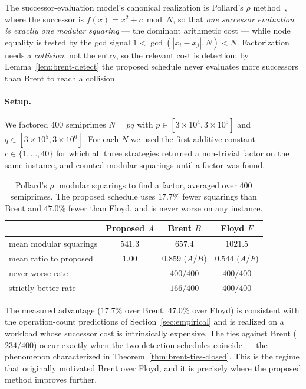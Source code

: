 \documentclass[11pt]{article}
\begin{document}
The successor-evaluation model's canonical realization is Pollard's $\rho$
method~\cite{pollard1975}, where the successor is $f(x)=x^2+c \bmod N$, so that
\emph{one successor evaluation is exactly one modular squaring} --- the dominant
arithmetic cost --- while node equality is tested by the gcd signal
$1<\gcd(|x_i-x_j|,N)<N$. Factorization needs a \emph{collision}, not the entry,
so the relevant cost is detection: by Lemma~\ref{lem:brent-detect} the proposed
schedule never evaluates more successors than Brent to reach a collision.

\paragraph{Setup.}
We factored $400$ semiprimes $N=pq$ with $p\in[3\times10^4,3\times10^5]$ and
$q\in[3\times10^5,3\times10^6]$. For each $N$ we used the first additive constant
$c\in\{1,\dots,40\}$ for which all three strategies returned a non-trivial factor
on the same instance, and counted modular squarings until a factor was found.

\begin{table}[H]\centering
\caption{Pollard's $\rho$: modular squarings to find a factor, averaged over
$400$ semiprimes. The proposed schedule uses $17.7\%$ fewer squarings than Brent
and $47.0\%$ fewer than Floyd, and is never worse on any instance.}
\label{tab:rho}
\begin{tabular}{lccc}
\toprule
 & Proposed $A$ & Brent $B$ & Floyd $F$\\
\midrule
mean modular squarings & $541.3$ & $657.4$ & $1021.5$\\
mean ratio to proposed & $1.00$ & $0.859$ ($A/B$) & $0.544$ ($A/F$)\\
never-worse rate & --- & $400/400$ & $400/400$\\
strictly-better rate & --- & $166/400$ & $400/400$\\
\bottomrule
\end{tabular}
\end{table}

The measured advantage ($17.7\%$ over Brent, $47.0\%$ over Floyd) is consistent
with the operation-count predictions of Section~\ref{sec:empirical} and is
realized on a workload whose successor cost is intrinsically expensive. The ties
against Brent ($234/400$) occur exactly when the two detection schedules coincide
--- the phenomenon characterized in Theorem~\ref{thm:brent-ties-closed}. This is
the regime that originally motivated Brent over Floyd, and it is precisely where
the proposed method improves further.
\end{document}
